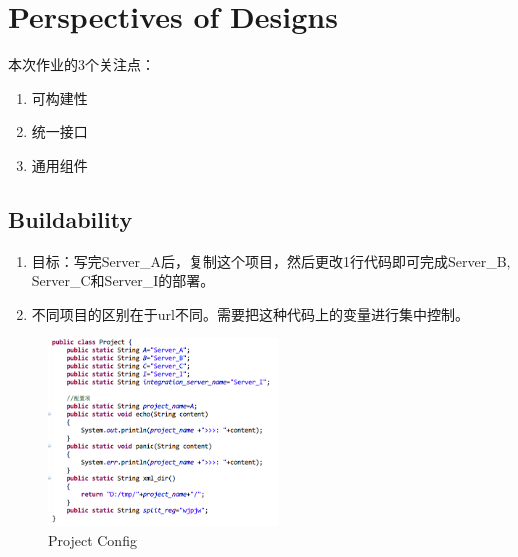 ﻿\documentclass{beamer}
\begin{document}
\section{Perspectives of Designs}
\begin{frame}
  本次作业的3个关注点：
  \begin{enumerate}
  \item
    可构建性
    \pause
  \item
    统一接口
    \pause
  \item
    通用组件
    \pause
  \end{enumerate}
\end{frame}


\subsection{Buildability}
\begin{frame}
  \begin{enumerate}
  \item
    目标：写完Server\_A后，复制这个项目，然后更改1行代码即可完成Server\_B, Server\_C和Server\_I的部署。
    \pause
  \item
    不同项目的区别在于url不同。需要把这种代码上的变量进行集中控制。
    \pause
  \end{enumerate}
\end{frame}

\begin{frame}
  \begin{figure}
    \includegraphics[width=2.4in]{img/2.PNG}
    \caption{Project Config}
  \end{figure}
\end{frame}
\end{document}
